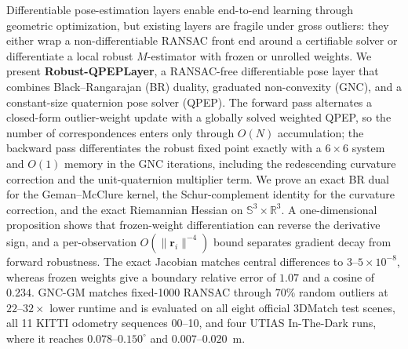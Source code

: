 Differentiable pose-estimation layers enable end-to-end learning through geometric optimization, but
existing layers are fragile under gross outliers: they either wrap a non-differentiable RANSAC front
end around a certifiable solver or differentiate a local robust $M$-estimator with frozen or unrolled
weights. We present \textbf{Robust-QPEPLayer}, a RANSAC-free differentiable pose layer that combines
Black--Rangarajan (BR) duality, graduated non-convexity (GNC), and a constant-size quaternion pose
solver (QPEP). The forward pass alternates a closed-form outlier-weight update with a globally solved
weighted QPEP, so the number of correspondences enters only through $O(N)$ accumulation; the backward
pass differentiates the robust fixed point exactly with a $6\times6$ system and $O(1)$ memory in the
GNC iterations, including the redescending curvature correction and the unit-quaternion multiplier
term. We prove an exact BR dual for the Geman--McClure kernel, the Schur-complement identity for the
curvature correction, and the exact Riemannian Hessian on $\mathbb{S}^3\times\mathbb{R}^3$. A
one-dimensional proposition shows that frozen-weight differentiation can reverse the derivative
sign, and a per-observation $O(\|\mathbf{r}_i\|^{-4})$ bound separates gradient decay from forward
robustness. The exact Jacobian matches central differences to $3$--$5\times10^{-8}$, whereas frozen
weights give a boundary relative error of $1.07$ and a cosine of $0.234$. GNC-GM matches fixed-1000
RANSAC through $70\%$ random outliers at $22$--$32\times$ lower runtime and is evaluated on all eight
official 3DMatch test scenes, all 11 KITTI odometry sequences 00--10, and four UTIAS In-The-Dark
runs, where it reaches $0.078$--$0.150^\circ$ and $0.007$--$0.020$~m.
